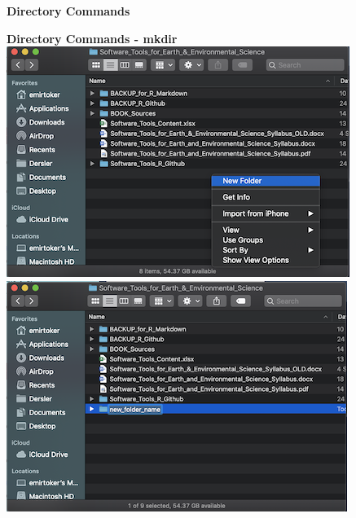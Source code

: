 \documentclass[ignorenonframetext,]{beamer}
\begin{document}
\begin{frame}[fragile]{\textbf{Directory Commands}}
\begin{block}{\textbf{Directory Commands - {\textbf{mkdir}}}}
\includegraphics{mkdir1.png} \includegraphics{mkdir2.png}

\end{block}

\end{frame}
\end{document}
